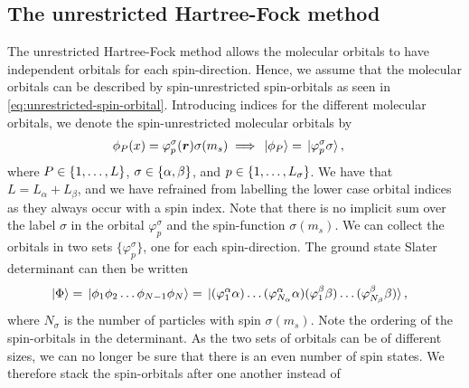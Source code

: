         \subsection{The unrestricted Hartree-Fock method}
            The unrestricted Hartree-Fock method allows the molecular orbitals
            to have independent orbitals for each spin-direction.
            Hence, we assume that the molecular orbitals can be described by
            spin-unrestricted spin-orbitals as seen in
            \autoref{eq:unrestricted-spin-orbital}.
            Introducing indices for the different molecular orbitals, we denote
            the spin-unrestricted molecular orbitals by
            \begin{align}
                \phi_P(x)
                &=
                \varphi^{\sigma}_{p}(\boldsymbol{r})
                \sigma(m_s)
                \implies
                \ket*{\phi_P}
                = \ket*{\varphi^{\sigma}_{p}\sigma},
            \end{align}
            where $P \in \left\{ 1, \dots, L \right\}$, $\sigma \in \left\{ \alpha, \beta \right\}$,
            and $p \in \left\{ 1, \dots, L_{\sigma} \right\}$.
            We have that $L = L_{\alpha} + L_{\beta}$, and we have refrained
            from labelling the lower case orbital indices as they always occur
            with a spin index.
            Note that there is no implicit sum over the label $\sigma$ in the
            orbital $\varphi^{\sigma}_{p}$ and the spin-function $\sigma(m_s)$.
            We can collect the orbitals in two sets
            $\bigl\{\varphi^{\sigma}_{p}\bigr\}$, one for each spin-direction.
            The ground state Slater determinant can then be written
            \begin{align}
                \ket*{\Phi}
                &=
                \ket*{\phi_1 \phi_2 \dots \phi_{N - 1} \phi_N}
                =
                \ket*{
                    (\varphi^{\alpha}_{1}\alpha)
                    \dots
                    (\varphi^{\alpha}_{N_{\alpha}}\alpha)
                    (\varphi^{\beta}_{1}\beta)
                    \dots
                    (\varphi^{\beta}_{N_{\beta}}\beta)
                },
            \end{align}
            where $N_{\sigma}$ is the number of particles with spin
            $\sigma(m_s)$.
            Note the ordering of the spin-orbitals in the determinant.
            As the two sets of orbitals can be of different sizes, we can no
            longer be sure that there is an even number of spin states.
            We therefore stack the spin-orbitals after one another instead of
